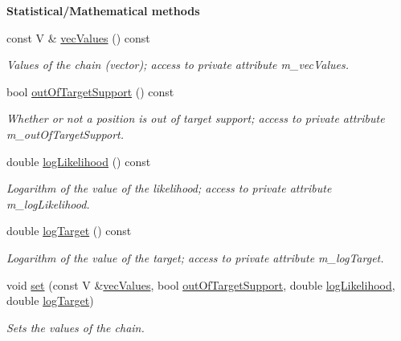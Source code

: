 \begin{Indent}{\bf Statistical/\-Mathematical methods}\par
\begin{DoxyCompactItemize}
\item 
const V \& \hyperlink{class_q_u_e_s_o_1_1_markov_chain_position_data_a1ad19966c9bcb480d4f055ab6f3dc244}{vec\-Values} () const 
\begin{DoxyCompactList}\small\item\em Values of the chain (vector); access to private attribute m\-\_\-vec\-Values. \end{DoxyCompactList}\item 
bool \hyperlink{class_q_u_e_s_o_1_1_markov_chain_position_data_a466849f2d261962720d7c8968e95b5f1}{out\-Of\-Target\-Support} () const 
\begin{DoxyCompactList}\small\item\em Whether or not a position is out of target support; access to private attribute m\-\_\-out\-Of\-Target\-Support. \end{DoxyCompactList}\item 
double \hyperlink{class_q_u_e_s_o_1_1_markov_chain_position_data_a4d0fc22cd5a10065474ceaba13d18857}{log\-Likelihood} () const 
\begin{DoxyCompactList}\small\item\em Logarithm of the value of the likelihood; access to private attribute m\-\_\-log\-Likelihood. \end{DoxyCompactList}\item 
double \hyperlink{class_q_u_e_s_o_1_1_markov_chain_position_data_aa553894577fdc44739538bf51d30555b}{log\-Target} () const 
\begin{DoxyCompactList}\small\item\em Logarithm of the value of the target; access to private attribute m\-\_\-log\-Target. \end{DoxyCompactList}\item 
void \hyperlink{class_q_u_e_s_o_1_1_markov_chain_position_data_aa6a5a75dd4661a811956b42a68291e7b}{set} (const V \&\hyperlink{class_q_u_e_s_o_1_1_markov_chain_position_data_a1ad19966c9bcb480d4f055ab6f3dc244}{vec\-Values}, bool \hyperlink{class_q_u_e_s_o_1_1_markov_chain_position_data_a466849f2d261962720d7c8968e95b5f1}{out\-Of\-Target\-Support}, double \hyperlink{class_q_u_e_s_o_1_1_markov_chain_position_data_a4d0fc22cd5a10065474ceaba13d18857}{log\-Likelihood}, double \hyperlink{class_q_u_e_s_o_1_1_markov_chain_position_data_aa553894577fdc44739538bf51d30555b}{log\-Target})
\begin{DoxyCompactList}\small\item\em Sets the values of the chain. \end{DoxyCompactList}\end{DoxyCompactItemize}
\end{Indent}
